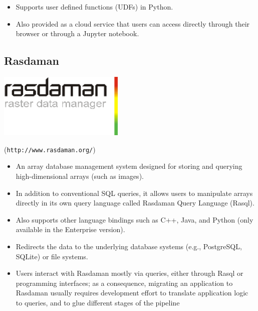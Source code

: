 \documentclass[a0,landscape]{a0poster}
\begin{document}
\begin{multicols}{3}
\begin{itemize}
   \item Supports user defined functions (UDFs) in Python.

   \item Also provided as a cloud service that users can access directly through their browser or through a Jupyter notebook.

\end{itemize}
\begin{minipage}[b]{0.75\linewidth}
  \subsection*{Rasdaman}
\end{minipage}
\begin{minipage}[b]{0.25\linewidth}
  \includegraphics[width=6cm]{rasdaman-logo.png}
\end{minipage}

(\texttt{http://www.rasdaman.org/})
\begin{itemize}
\item An array database management system designed for storing and querying high-dimensional arrays (such as images).

\item In addition to conventional SQL queries, it allows users to manipulate arrays directly in its own query language called Rasdaman Query Language (Rasql).

\item Also supports other language bindings such as C++, Java, and Python (only available in the Enterprise version).

\item Redirects the data to the underlying database systems (e.g., PostgreSQL, SQLite) or file systems.

\item Users interact with Rasdaman mostly via queries, either through Rasql or programming interfaces; as a consequence, migrating an application to Rasdaman usually requires development effort to translate application logic to queries, and to glue different stages of the pipeline
\end{itemize}


\end{multicols}
\end{document}
